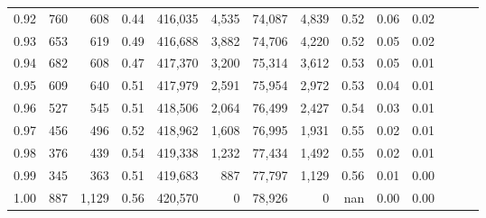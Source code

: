 \begin{tabular}{rrrrrrrrrrrrrr}
0.92 &    760 &    608 &  0.44 &  416,035 &    4,535 &  74,087 &   4,839 &  0.52 &  0.06 &      0.02 \\
0.93 &    653 &    619 &  0.49 &  416,688 &    3,882 &  74,706 &   4,220 &  0.52 &  0.05 &      0.02 \\
0.94 &    682 &    608 &  0.47 &  417,370 &    3,200 &  75,314 &   3,612 &  0.53 &  0.05 &      0.01 \\
0.95 &    609 &    640 &  0.51 &  417,979 &    2,591 &  75,954 &   2,972 &  0.53 &  0.04 &      0.01 \\
0.96 &    527 &    545 &  0.51 &  418,506 &    2,064 &  76,499 &   2,427 &  0.54 &  0.03 &      0.01 \\
0.97 &    456 &    496 &  0.52 &  418,962 &    1,608 &  76,995 &   1,931 &  0.55 &  0.02 &      0.01 \\
0.98 &    376 &    439 &  0.54 &  419,338 &    1,232 &  77,434 &   1,492 &  0.55 &  0.02 &      0.01 \\
0.99 &    345 &    363 &  0.51 &  419,683 &      887 &  77,797 &   1,129 &  0.56 &  0.01 &      0.00 \\
1.00 &    887 &  1,129 &  0.56 &  420,570 &        0 &  78,926 &       0 &   nan &  0.00 &      0.00 \\
\bottomrule
\end{tabular}
